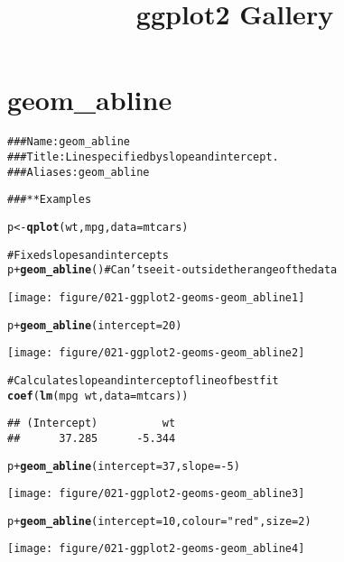 \documentclass[a4paper,titlepage]{tufte-handout}\usepackage{graphicx, color}
\title{ggplot2 Gallery}
\makeatletter
\def\maxwidth{ %
  \ifdim\Gin@nat@width>\linewidth
    \linewidth
  \else
    \Gin@nat@width
  \fi
}
\newcommand{\hlfunctioncall}[1]{\textcolor[rgb]{0.501960784313725,0,0.329411764705882}{\textbf{#1}}}%
\newcommand{\hlstring}[1]{\textcolor[rgb]{0.6,0.6,1}{#1}}%
\newcommand{\hlcomment}[1]{\textcolor[rgb]{0.180392156862745,0.6,0.341176470588235}{#1}}%
\newenvironment{kframe}{%
 \def\at@end@of@kframe{}%
 \ifinner\ifhmode%
  \def\at@end@of@kframe{\end{minipage}}%
  \begin{minipage}{\columnwidth}%
 \fi\fi%
 \def\FrameCommand##1{\hskip\@totalleftmargin \hskip-\fboxsep
 \colorbox{shadecolor}{##1}\hskip-\fboxsep
     \hskip-\linewidth \hskip-\@totalleftmargin \hskip\columnwidth}%
 \MakeFramed {\advance\hsize-\width
   \@totalleftmargin\z@ \linewidth\hsize
   \@setminipage}}%
 {\par\unskip\endMakeFramed%
 \at@end@of@kframe}
\newenvironment{knitrout}{}{} %
\makeatother
\begin{document}
\maketitle
\tableofcontents







\section{geom\_abline}

\begin{knitrout}
\color{fgcolor}\begin{kframe}
\begin{alltt}
\hlcomment{### Name: geom_abline}
\hlcomment{### Title: Line specified by slope and intercept.}
\hlcomment{### Aliases: geom_abline}

\hlcomment{### ** Examples}

p <- \hlfunctioncall{qplot}(wt, mpg, data = mtcars)

\hlcomment{# Fixed slopes and intercepts}
p + \hlfunctioncall{geom_abline}() \hlcomment{# Can't see it - outside the range of the data}
\end{alltt}
\end{kframe}
\texttt{[image: figure/021-ggplot2-geoms-geom\_abline1]} 
\begin{kframe}\begin{alltt}
p + \hlfunctioncall{geom_abline}(intercept = 20)
\end{alltt}
\end{kframe}
\texttt{[image: figure/021-ggplot2-geoms-geom\_abline2]} 
\begin{kframe}\begin{alltt}

\hlcomment{# Calculate slope and intercept of line of best fit}
\hlfunctioncall{coef}(\hlfunctioncall{lm}(mpg ~ wt, data = mtcars))
\end{alltt}
\begin{verbatim}
## (Intercept)          wt 
##      37.285      -5.344
\end{verbatim}
\begin{alltt}
p + \hlfunctioncall{geom_abline}(intercept = 37, slope = -5)
\end{alltt}
\end{kframe}
\texttt{[image: figure/021-ggplot2-geoms-geom\_abline3]} 
\begin{kframe}\begin{alltt}
p + \hlfunctioncall{geom_abline}(intercept = 10, colour = \hlstring{"red"}, size = 2)
\end{alltt}
\end{kframe}
\texttt{[image: figure/021-ggplot2-geoms-geom\_abline4]} 
\begin{kframe}\begin{alltt}


\end{alltt}
\end{kframe}
\end{knitrout}
\end{document}
